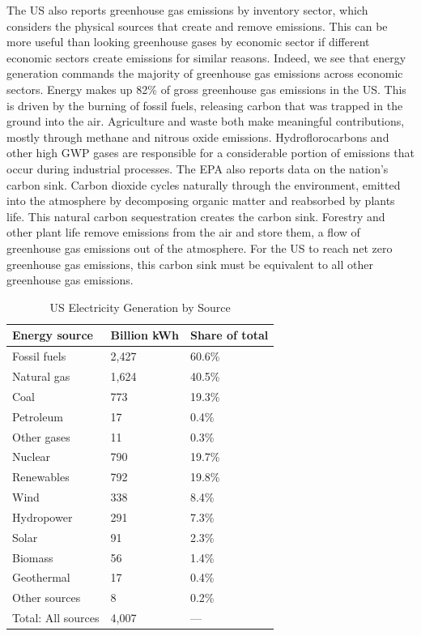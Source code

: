 The US also reports greenhouse gas emissions by inventory sector, which considers the physical sources that create and remove emissions. This can be more useful than looking greenhouse gases by economic sector if different economic sectors create emissions for similar reasons. Indeed, we see that energy generation commands the majority of greenhouse gas emissions across economic sectors. Energy makes up 82\% of gross greenhouse gas emissions in the US. This is driven by the burning of fossil fuels, releasing carbon that was trapped in the ground into the air. Agriculture and waste both make meaningful contributions, mostly through methane and nitrous oxide emissions. Hydroflorocarbons and other high GWP gases are responsible for a considerable portion of emissions that occur during industrial processes. The EPA also reports data on the nation's carbon sink. Carbon dioxide cycles naturally through the environment, emitted into the atmosphere by decomposing organic matter and reabsorbed by plants life. This natural carbon sequestration creates the carbon sink. Forestry and other plant life remove emissions from the air and store them, a flow of greenhouse gas emissions out of the atmosphere. For the US to reach net zero greenhouse gas emissions, this carbon sink must be equivalent to all other greenhouse gas emissions. 

\begin{table}
\caption{US Electricity Generation by Source \label{ele_gen_source}}
\centering
\begin{tabular}{l C{3cm} C{3cm}}
\hline \hline
Energy source & Billion kWh &	Share of total \\ 
\hline 
Fossil fuels & 2,427 & 60.6\% \\
\qquad Natural gas &	1,624	& 40.5\% \\
\qquad Coal & 773 & 19.3\%\\
\qquad Petroleum	& 17 & 0.4\% \\
\qquad Other gases & 11& 0.3\% \\
Nuclear & 790	& 19.7\% \\
Renewables & 792 & 19.8\% \\
\qquad Wind & 338 & 8.4\%\\
\qquad Hydropower	& 291 &	7.3\% \\
\qquad Solar & 91 & 2.3\% \\
\qquad Biomass	& 56 & 1.4\% \\
\qquad Geothermal & 17 & 0.4\% \\
Other sources & 8 & 0.2\% \\
Total: All sources	& 4,007  & ---\\
\hline \hline
\end{tabular}
\vspace{0.5em}
\end{table}

